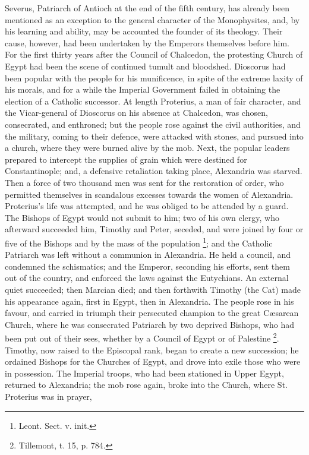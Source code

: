 Severus, Patriarch of Antioch at the end of the fifth century, has
already been mentioned as an exception to the general character of the
Monophysites, and, by his learning and ability, may be accounted the
founder of its theology. Their cause, however, had been undertaken by
the Emperors themselves before him. For the first thirty years after
the Council of Chalcedon, the protesting Church of Egypt had been the
scene of continued tumult and bloodshed. Dioscorus had been popular
with the people for his munificence, in spite of the extreme laxity of
his morals, and for a while the Imperial Government failed in
obtaining the election of a Catholic successor. At length Proterius, a
man of fair character, and the Vicar-general of Dioscorus on his
absence at Chalcedon, was chosen, consecrated, and enthroned; but the
people rose against the civil authorities, and the military, coming
to
their defence, were attacked with stones, and pursued into a church,
where they were burned alive by the mob. Next, the popular leaders
prepared to intercept the supplies of grain which were destined for
Constantinople; and, a defensive retaliation taking place, Alexandria
was starved. Then a force of two thousand men was sent for the
restoration of order, who permitted themselves in scandalous excesses
towards the women of Alexandria. Proterius's life was attempted, and
he was obliged to be attended by a guard. The Bishops of Egypt would
not submit to him; two of his own clergy, who afterward succeeded him,
Timothy and Peter, seceded, and were joined by four or five of the
Bishops and by the mass of the population \footnote{Leont. Sect. v. init.}; and the Catholic Patriarch was left without a communion in
Alexandria. He held a council, and condemned the schismatics; and the
Emperor, seconding his efforts, sent them out of the country, and
enforced the laws against the Eutychians. An external quiet succeeded;
then Marcian died; and then forthwith Timothy (the Cat) made his
appearance again, first in Egypt, then in Alexandria. The people rose
in his favour, and carried in triumph their persecuted champion to the
great Cæsarean Church, where he was consecrated Patriarch by two
deprived Bishops, who had been put out of their sees, whether by a
Council of Egypt or of Palestine \footnote{Tillemont, t. 15, p. 784.}. Timothy, now raised to the Episcopal rank, began to create a
new succession; he ordained Bishops for the Churches of Egypt, and
drove into exile those who were in possession. The Imperial troops,
who had been stationed in Upper Egypt, returned to Alexandria; the mob
rose again, broke into the Church, where St. Proterius was in prayer,
